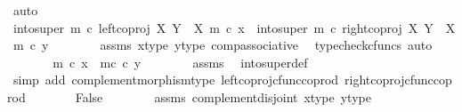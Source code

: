 \begin{isabellebody}
\ auto\isanewline
\ \ \ \ \isamarkupfalse%
\ \isamarkupfalse%
\ {\isachardoublequoteopen}{\isacharparenleft}{\kern0pt}into{\isacharunderscore}{\kern0pt}super\ m\ {\isasymcirc}\isactrlsub c\ left{\isacharunderscore}{\kern0pt}coproj\ X\ {\isacharparenleft}{\kern0pt}Y\ {\isasymsetminus}\ {\isacharparenleft}{\kern0pt}X{\isacharcomma}{\kern0pt}\ m{\isacharparenright}{\kern0pt}{\isacharparenright}{\kern0pt}{\isacharparenright}{\kern0pt}\ {\isasymcirc}\isactrlsub c\ x{\isacharprime}{\kern0pt}\ {\isacharequal}{\kern0pt}\ {\isacharparenleft}{\kern0pt}into{\isacharunderscore}{\kern0pt}super\ m\ {\isasymcirc}\isactrlsub c\ right{\isacharunderscore}{\kern0pt}coproj\ X\ {\isacharparenleft}{\kern0pt}Y\ {\isasymsetminus}\ {\isacharparenleft}{\kern0pt}X{\isacharcomma}{\kern0pt}\ m{\isacharparenright}{\kern0pt}{\isacharparenright}{\kern0pt}{\isacharparenright}{\kern0pt}\ {\isasymcirc}\isactrlsub c\ y{\isacharprime}{\kern0pt}{\isachardoublequoteclose}\isanewline
\ \ \ \ \ \ \isamarkupfalse%
\ assms\ x{\isacharprime}{\kern0pt}{\isacharunderscore}{\kern0pt}type\ y{\isacharprime}{\kern0pt}{\isacharunderscore}{\kern0pt}type\ comp{\isacharunderscore}{\kern0pt}associative{}\ \isamarkupfalse%
\ {\isacharparenleft}{\kern0pt}typecheck{\isacharunderscore}{\kern0pt}cfuncs{\isacharcomma}{\kern0pt}\ auto{\isacharparenright}{\kern0pt}\isanewline
\ \ \ \ \isamarkupfalse%
\ \isamarkupfalse%
\ {\isachardoublequoteopen}m\ {\isasymcirc}\isactrlsub c\ x{\isacharprime}{\kern0pt}\ {\isacharequal}{\kern0pt}\ m\isactrlsup c\ {\isasymcirc}\isactrlsub c\ y{\isacharprime}{\kern0pt}{\isachardoublequoteclose}\isanewline
\ \ \ \ \ \ \isamarkupfalse%
\ assms\ \isamarkupfalse%
\ into{\isacharunderscore}{\kern0pt}super{\isacharunderscore}{\kern0pt}def\isanewline
\ \ \ \ \ \ \isamarkupfalse%
\ {\isacharparenleft}{\kern0pt}simp\ add{\isacharcolon}{\kern0pt}\ complement{\isacharunderscore}{\kern0pt}morphism{\isacharunderscore}{\kern0pt}type\ left{\isacharunderscore}{\kern0pt}coproj{\isacharunderscore}{\kern0pt}cfunc{\isacharunderscore}{\kern0pt}coprod\ right{\isacharunderscore}{\kern0pt}coproj{\isacharunderscore}{\kern0pt}cfunc{\isacharunderscore}{\kern0pt}coprod{\isacharparenright}{\kern0pt}\isanewline
\ \ \ \ \isamarkupfalse%
\ \isamarkupfalse%
\ False\isanewline
\ \ \ \ \ \ \isamarkupfalse%
\ assms\ complement{\isacharunderscore}{\kern0pt}disjoint\ x{\isacharprime}{\kern0pt}{\isacharunderscore}{\kern0pt}type\ y{\isacharprime}{\kern0pt}{\isacharunderscore}{\kern0pt}type\ \isamarkupfalse%

\end{isabellebody}
